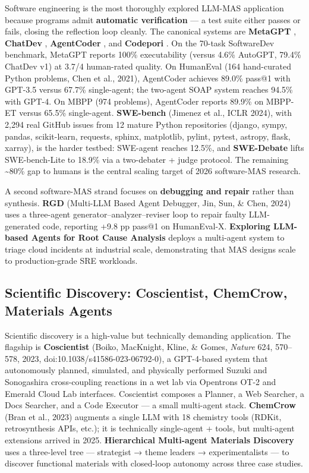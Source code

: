 \documentclass{article}
\begin{document}
Software engineering is the most thoroughly explored LLM-MAS application because programs admit \textbf{automatic verification} --- a test suite either passes or fails, closing the reflection loop cleanly. The canonical systems are \textbf{MetaGPT} \citep{hong20242023}, \textbf{ChatDev} \citep{qian20242023}, \textbf{AgentCoder} \citep{huang2023agentcodermultiage}, and \textbf{Codepori} \citep{rasheed20242024}. On the 70-task SoftwareDev benchmark, MetaGPT reports 100\% executability (versus 4.6\% AutoGPT, 79.4\% ChatDev v1) at 3.7/4 human-rated quality. On HumanEval (164 hand-curated Python problems, Chen et al., 2021), AgentCoder achieves 89.0\% pass@1 with GPT-3.5 versus 67.7\% single-agent; the two-agent SOAP system reaches 94.5\% with GPT-4. On MBPP (974 problems), AgentCoder reports 89.9\% on MBPP-ET versus 65.5\% single-agent. \textbf{SWE-bench} (Jimenez et al., ICLR 2024), with 2,294 real GitHub issues from 12 mature Python repositories (django, sympy, pandas, scikit-learn, requests, sphinx, matplotlib, pylint, pytest, astropy, flask, xarray), is the harder testbed: SWE-agent reaches 12.5\%, and \textbf{SWE-Debate} \citep{li20252025} lifts SWE-bench-Lite to 18.9\% via a two-debater + judge protocol. The remaining \textasciitilde80\% gap to humans is the central scaling target of 2026 software-MAS research.

A second software-MAS strand focuses on \textbf{debugging and repair} rather than synthesis. \textbf{RGD} (Multi-LLM Based Agent Debugger, Jin, Sun, \& Chen, 2024) uses a three-agent generator--analyzer--reviser loop to repair faulty LLM-generated code, reporting +9.8 pp pass@1 on HumanEval-X. \textbf{Exploring LLM-based Agents for Root Cause Analysis} \citep{roy20242024} deploys a multi-agent system to triage cloud incidents at industrial scale, demonstrating that MAS designs scale to production-grade SRE workloads.

\subsection{Scientific Discovery: Coscientist, ChemCrow, Materials Agents}\label{scientific-discovery-coscientist-chemcrow-materials-agents}

Scientific discovery is a high-value but technically demanding application. The flagship is \textbf{Coscientist} (Boiko, MacKnight, Kline, \& Gomes, \emph{Nature} 624, 570--578, 2023, doi:10.1038/s41586-023-06792-0), a GPT-4-based system that autonomously planned, simulated, and physically performed Suzuki and Sonogashira cross-coupling reactions in a wet lab via Opentrons OT-2 and Emerald Cloud Lab interfaces. Coscientist composes a Planner, a Web Searcher, a Docs Searcher, and a Code Executor --- a small multi-agent stack. \textbf{ChemCrow} (Bran et al., 2023) augments a single LLM with 18 chemistry tools (RDKit, retrosynthesis APIs, etc.); it is technically single-agent + tools, but multi-agent extensions arrived in 2025. \textbf{Hierarchical Multi-agent Materials Discovery} \citep{rothfarb20252025} uses a three-level tree --- strategist → theme leaders → experimentalists --- to discover functional materials with closed-loop autonomy across three case studies.
\end{document}
